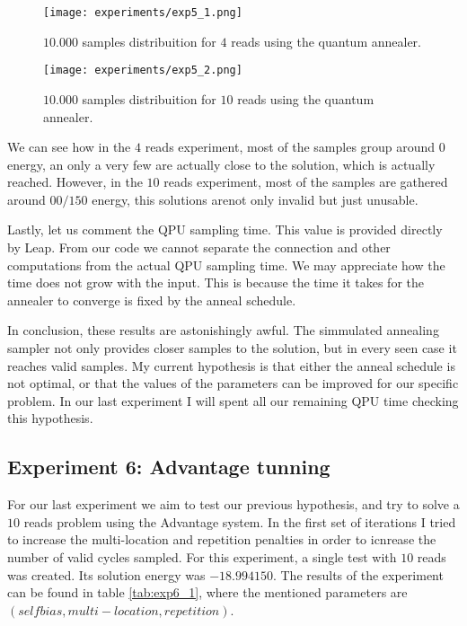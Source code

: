 \begin{figure}[H]
	\texttt{[image: experiments/exp5\_1.png]}
	\centering
	\caption{$10.000$ samples distribuition for $4$ reads using the quantum annealer.}
	\label{fig:exp5_1}
\end{figure}

\begin{figure}[H]
	\texttt{[image: experiments/exp5\_2.png]}
	\centering
	\caption{$10.000$ samples distribuition for $10$ reads using the quantum annealer.}
	\label{fig:exp5_2}
\end{figure}

We can see how in the $4$ reads experiment, most of the samples group around $0$ energy, an only a very few are actually close to the solution, which is actually reached. However, in the $10$ reads experiment, most of the samples are gathered around $00/150$ energy, this solutions arenot only invalid but just unusable.

Lastly, let us comment the QPU sampling time. This value is provided directly by Leap. From our code we cannot separate the connection and other computations from the actual QPU sampling time. We may appreciate how the time does not grow with the input. This is because the time it takes for the annealer to converge is fixed by the anneal schedule.

In conclusion, these results are astonishingly awful. The simmulated annealing sampler not only provides closer samples to the solution, but in every seen case it reaches valid samples. My current hypothesis is that either the anneal schedule is not optimal, or that the values of the parameters can be improved for our specific problem. In our last experiment I will spent all our remaining QPU time checking this hypothesis.


\subsection{Experiment 6: Advantage tunning}


For our last experiment we aim to test our previous hypothesis, and try to solve a $10$ reads problem using the Advantage system. In the first set of iterations I tried to increase the multi-location and repetition penalties in order to icnrease the number of valid cycles sampled. For this experiment, a single test with $10$ reads was created. Its solution energy was  $-18.994150$. The results of the experiment can be found in table \ref{tab:exp6_1}, where the mentioned parameters are $(self bias, multi-location, repetition)$.

